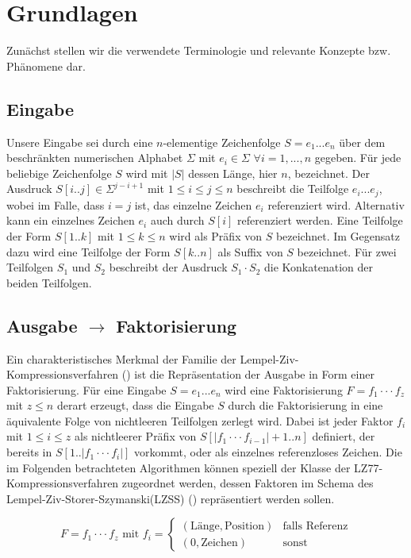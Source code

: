 \chapter{Grundlagen}

Zunächst stellen wir die verwendete Terminologie und relevante Konzepte bzw. Phänomene dar.

\section{Eingabe}
Unsere Eingabe sei durch eine $n$-elementige Zeichenfolge $S=e_1...e_n$ über dem beschränkten numerischen Alphabet $\Sigma$ mit $e_i\in \Sigma$ $\forall i=1,...,n$ gegeben. Für jede
beliebige Zeichenfolge $S$ wird mit $|S|$ dessen Länge, hier $n$, bezeichnet. Der Ausdruck $S[i..j]\in \Sigma^{j-i+1}$ mit $1\leq i\leq j\leq n$ beschreibt die Teilfolge $e_i...e_j$,
wobei im Falle, dass $i=j$ ist, das einzelne Zeichen $e_i$ referenziert wird. Alternativ kann ein einzelnes Zeichen $e_i$ auch durch $S[i]$ referenziert werden. Eine Teilfolge 
der Form $S[1..k]$ mit $1\leq k\leq n$ wird als Präfix von $S$ bezeichnet. Im Gegensatz dazu wird eine Teilfolge der Form $S[k..n]$ als Suffix von $S$ bezeichnet. Für zwei Teilfolgen
$S_1$ und $S_2$ beschreibt der Ausdruck $S_1\cdot S_2$ die Konkatenation der beiden Teilfolgen.

\section{Ausgabe $\rightarrow$ Faktorisierung}
Ein charakteristisches Merkmal der Familie der Lempel-Ziv-Kompressionsverfahren (\cite{LemZiv}) ist die Repräsentation der Ausgabe in Form einer Faktorisierung. Für eine Eingabe $S=e_1...e_n$ 
wird eine Faktorisierung $F=f_1\cdot\cdot\cdot f_z$ mit $z\leq n$ derart erzeugt, dass die Eingabe $S$ durch die Faktorisierung in eine äquivalente Folge von nichtleeren Teilfolgen 
zerlegt wird. Dabei ist jeder Faktor $f_i$ mit $1\leq i\leq z$ als nichtleerer Präfix von $S[|f_1\cdot\cdot\cdot f_{i-1}|+1..n]$ definiert, der bereits in $S[1..|f_1\cdot\cdot\cdot f_i|]$ 
vorkommt, oder als einzelnes referenzloses Zeichen. Die im Folgenden betrachteten Algorithmen können speziell der Klasse der LZ77-Kompressionsverfahren zugeordnet werden, dessen Faktoren im Schema 
des Lempel-Ziv-Storer-Szymanski(LZSS) (\cite{lzss}) repräsentiert werden sollen. 

\begin{equation} \label{eq:faktor}
    F = f_1\cdot\cdot\cdot f_z \text{ mit } f_i = \begin{cases} (\text{Länge}, \text{Position}) & \text{falls Referenz} \\ (0, \text{Zeichen}) & \text{sonst} \end{cases}
\end{equation}

